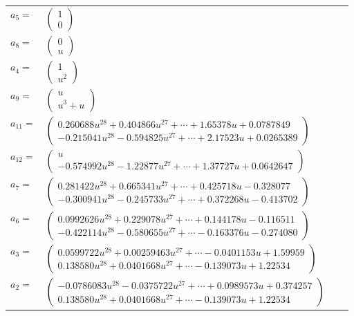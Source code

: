 \documentclass[1p]{elsarticle_modified}
\theoremstyle{definition}
\begin{document}
\begin{tabular}{m{7pt} m{180pt} m{7pt} m{180pt} }
\flushright $a_{5}=$&$\begin{pmatrix}1\\0\end{pmatrix}$ \\
\flushright $a_{8}=$&$\begin{pmatrix}0\\u\end{pmatrix}$ \\
\flushright $a_{4}=$&$\begin{pmatrix}1\\u^2\end{pmatrix}$ \\
\flushright $a_{9}=$&$\begin{pmatrix}u\\u^3+u\end{pmatrix}$ \\
\flushright $a_{11}=$&$\begin{pmatrix}0.260688 u^{28}+0.404866 u^{27}+\cdots+1.65378 u+0.0787849\\-0.215041 u^{28}-0.594825 u^{27}+\cdots+2.17523 u+0.0265389\end{pmatrix}$ \\
\flushright $a_{12}=$&$\begin{pmatrix}u\\-0.574992 u^{28}-1.22877 u^{27}+\cdots+1.37727 u+0.0642647\end{pmatrix}$ \\
\flushright $a_{7}=$&$\begin{pmatrix}0.281422 u^{28}+0.665341 u^{27}+\cdots+0.425718 u-0.328077\\-0.300941 u^{28}-0.245733 u^{27}+\cdots+0.372268 u-0.413702\end{pmatrix}$ \\
\flushright $a_{6}=$&$\begin{pmatrix}0.0992626 u^{28}+0.229078 u^{27}+\cdots+0.144178 u-0.116511\\-0.422114 u^{28}-0.580655 u^{27}+\cdots-0.163376 u-0.274080\end{pmatrix}$ \\
\flushright $a_{3}=$&$\begin{pmatrix}0.0599722 u^{28}+0.00259463 u^{27}+\cdots-0.0401153 u+1.59959\\0.138580 u^{28}+0.0401668 u^{27}+\cdots-0.139073 u+1.22534\end{pmatrix}$ \\
\flushright $a_{2}=$&$\begin{pmatrix}-0.0786083 u^{28}-0.0375722 u^{27}+\cdots+0.0989573 u+0.374257\\0.138580 u^{28}+0.0401668 u^{27}+\cdots-0.139073 u+1.22534\end{pmatrix}$ \\

\end{tabular}
\end{document}

